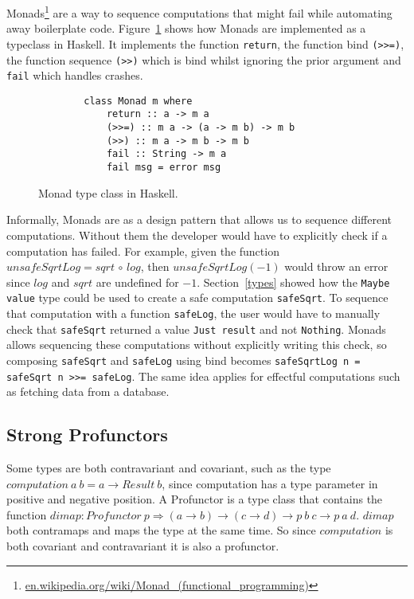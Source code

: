 Monads\footnote{\url{en.wikipedia.org/wiki/Monad_(functional_programming)}} are
a way to sequence computations that might fail while automating away boilerplate
code. Figure~\ref{monadclass} shows how Monads are implemented as a typeclass in
Haskell. It implements the function \texttt{return}, the function bind
\texttt{(>>=)}, the function sequence \texttt{(>>)} which is bind whilst
ignoring the prior argument and \texttt{fail} which handles crashes.

\begin{figure}[H]
    \begin{lstlisting}
        class Monad m where  
            return :: a -> m a  
            (>>=) :: m a -> (a -> m b) -> m b  
            (>>) :: m a -> m b -> m b  
            fail :: String -> m a  
            fail msg = error msg 
    \end{lstlisting}
    \caption{Monad type class in Haskell.}
    \label{monadclass}
\end{figure}

Informally, Monads are as a design pattern that allows us to sequence different
computations. Without them the developer would have to explicitly check if a
computation has failed. For example, given the function $unsafeSqrtLog =
sqrt\,\circ\,log$, then $unsafeSqrtLog(-1)$ would throw an error since $log$ and
$sqrt$ are undefined for $-1$.  Section~\ref{types} showed how the \texttt{Maybe
value} type could be used to create a safe computation \texttt{safeSqrt}.  To
sequence that computation with a function \texttt{safeLog}, the user would have
to manually check that \texttt{safeSqrt} returned a value \texttt{Just result}
and not \texttt{Nothing}. Monads allows sequencing these computations without
explicitly writing this check, so composing \texttt{safeSqrt} and
\texttt{safeLog} using bind becomes \texttt{safeSqrtLog n = safeSqrt n >>=
safeLog}. The same idea applies for effectful computations such as fetching data
from a database.

\subsection{Strong Profunctors}\label{profunctor}

Some types are both contravariant and covariant, such as the type $computation\
a\ b = a\rightarrow Result\ b$, since computation has a type parameter in positive
and negative position. A Profunctor is a type class that contains the function
$dimap : Profunctor\ p \Rightarrow (a\rightarrow b)\rightarrow (c\rightarrow d) \rightarrow p\ b\
c\rightarrow p\ a\ d$. $dimap$ both contramaps and maps the type at the same
time. So since $computation$ is both covariant and contravariant it is also a
profunctor. 

